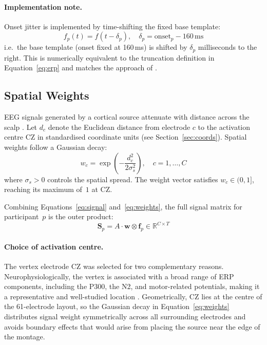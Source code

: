 \documentclass[12pt, a4paper]{article}
\begin{document}
\paragraph{Implementation note.}
Onset jitter is implemented by time-shifting the fixed base template:
%
\[
  f_p(t) = f(t - \delta_p), \quad
  \delta_p = \mathrm{onset}_p - 160\,\text{ms}
\]
%
i.e.\ the base template (onset fixed at 160\,ms) is shifted by $\delta_p$
milliseconds to the right.
This is numerically equivalent to the truncation definition in
Equation~\eqref{eq:erp} and matches the approach of \citet{Nalborczyk2025}.

\subsection{Spatial Weights}\label{sec:weights}

EEG signals generated by a cortical source attenuate with distance across
the scalp \citep{NunezSrinivasan2006}.
Let $d_c$ denote the Euclidean distance from electrode $c$ to the activation
centre CZ in standardised coordinate units (see Section~\ref{sec:coords}).
Spatial weights follow a Gaussian decay:
%
\begin{equation}\label{eq:weights}
  w_c
  = \exp\!\left(-\frac{d_c^2}{2\sigma_s^2}\right),
  \quad c = 1, \ldots, C
\end{equation}
%
where $\sigma_s > 0$ controls the spatial spread.
The weight vector satisfies $w_c \in (0,1]$, reaching its maximum
of~$1$ at CZ.

Combining Equations~\eqref{eq:signal} and~\eqref{eq:weights}, the full
signal matrix for participant~$p$ is the outer product:
%
\begin{equation}\label{eq:signal_matrix}
  \mathbf{S}_p = A \cdot \mathbf{w} \otimes \mathbf{f}_p \in \mathbb{R}^{C \times T}
\end{equation}

\paragraph{Choice of activation centre.}
The vertex electrode CZ was selected for two complementary reasons.
Neurophysiologically, the vertex is associated with a broad range of ERP
components, including the P300, the N2, and motor-related potentials, making
it a representative and well-studied location \citep{NunezSrinivasan2006}.
Geometrically, CZ lies at the centre of the 61-electrode layout, so the
Gaussian decay in Equation~\eqref{eq:weights} distributes signal weight
symmetrically across all surrounding electrodes and avoids boundary effects
that would arise from placing the source near the edge of the montage.
\end{document}
